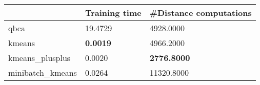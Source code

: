 \begin{table}[htbp]
\centering
\begin{tabular}{lll}
\toprule
 & Training time & #Distance computations \\
\midrule
qbca & 19.4729 & 4928.0000 \\
kmeans & \textbf{0.0019} & 4966.2000 \\
kmeans_plusplus & 0.0020 & \textbf{2776.8000} \\
minibatch_kmeans & 0.0264 & 11320.8000 \\
\bottomrule
\end{tabular}
\end{table}
